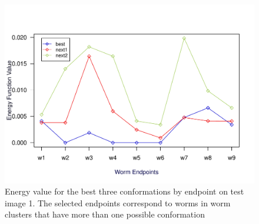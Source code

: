 \begin{figure}[h t b p ! H]
 \centering
   \includegraphics[scale=0.9]{results/test1/energy-graph}
 \caption{Energy value for the best three conformations by endpoint on test
image 1. The selected endpoints correspond to worms in worm clusters that
have more than one possible conformation}
\end{figure}
